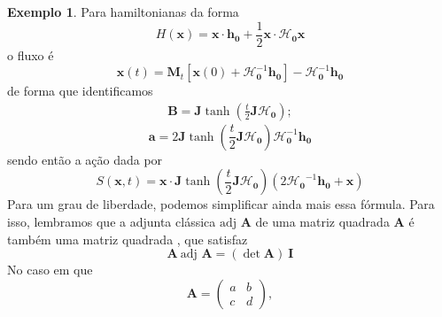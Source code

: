 \documentclass[
	12pt,
	oneside,			%
	a4paper,			%
	english,			%
	brazil				%
	]{abntex2}
\theoremstyle{definition}
\newtheorem{exmp}{Exemplo}[chapter]
\begin{document}
\begin{exmp}
    Para hamiltonianas da forma
    \begin{equation}
        \label{hamiltoniana_quadrática}
        H(\mathbf{x}) = \mathbf{x} \cdot \mathbf{h}_{\mathbf{0}} + \frac{1}{2} \mathbf{x} \cdot \boldsymbol{\mathcal{H}}_{\mathbf{0}} \mathbf{x}
    \end{equation}
    o fluxo é 
    \begin{equation}
        \mathbf{x}(t) = \mathbf{M}_t \left[\mathbf{x}(0) + \boldsymbol{\mathcal{H}}^{-1}_{\mathbf{0}} \mathbf{h}_{\mathbf{0}} \right] -  \boldsymbol{\mathcal{H}}^{-1}_{\mathbf{0}}\mathbf{h}_{\mathbf{0}}
    \end{equation}
    de forma que identificamos
    \begin{equation}
        \begin{aligned}
            \mathbf{B} = \mathbf{J}\tanh \left(\frac{t}{2}\mathbf{J} \boldsymbol{\mathcal{H}}_{\mathbf{0}}\right) ;
        \end{aligned}
    \end{equation}
    \begin{equation}
        \mathbf{a} =  2\mathbf{J}\tanh \left(\frac{t}{2}\mathbf{J} \boldsymbol{\mathcal{H}}_{\mathbf{0}}\right) \boldsymbol{\mathcal{H}}_{\mathbf{0}}^{-1} \mathbf{h_0}
    \end{equation}
    sendo então a ação dada por
    \begin{equation}
    \label{ação quadratica multidimensional}
        S(\mathbf{x},t) = \mathbf{x} \cdot \mathbf{J}\tanh \left(\frac{t}{2}\mathbf{J} \boldsymbol{\mathcal{H}}_{\mathbf{0}}\right)\left(  2 \boldsymbol{\mathcal{H}_{\mathbf{0}}}^{-1} \mathbf{h_0} +  \mathbf{x}\right)
    \end{equation}
    Para um grau de liberdade, podemos simplificar ainda mais essa fórmula. Para isso, lembramos que a adjunta clássica $\text{adj }  \mathbf{A}$ de uma matriz quadrada $\mathbf{A}$ é também uma matriz quadrada \cite{lima2016algebra}, que satisfaz
    \begin{equation}
    \label{definição adjunta}
        \mathbf{A} \ \text{adj } \mathbf{A} = \left( \det \mathbf{A} \right) \ \mathbf{I}
    \end{equation}
    No caso em que
    \begin{equation}
        \mathbf{A} = \begin{pmatrix}
        a & b \\
        c & d
        \end{pmatrix},
    \end{equation}

\end{exmp}
\end{document}
